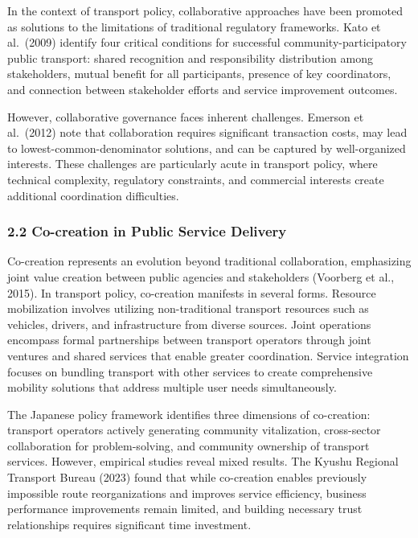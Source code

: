In the context of transport policy, collaborative approaches have been
promoted as solutions to the limitations of traditional regulatory
frameworks. Kato et al.~(2009) identify four critical conditions for
successful community-participatory public transport: shared recognition
and responsibility distribution among stakeholders, mutual benefit for
all participants, presence of key coordinators, and connection between
stakeholder efforts and service improvement outcomes.

However, collaborative governance faces inherent challenges. Emerson et
al.~(2012) note that collaboration requires significant transaction
costs, may lead to lowest-common-denominator solutions, and can be
captured by well-organized interests. These challenges are particularly
acute in transport policy, where technical complexity, regulatory
constraints, and commercial interests create additional coordination
difficulties.

\subsubsection{2.2 Co-creation in Public Service
Delivery}\label{co-creation-in-public-service-delivery}

Co-creation represents an evolution beyond traditional collaboration,
emphasizing joint value creation between public agencies and
stakeholders (Voorberg et al., 2015). In transport policy, co-creation
manifests in several forms. Resource mobilization involves utilizing
non-traditional transport resources such as vehicles, drivers, and
infrastructure from diverse sources. Joint operations encompass formal
partnerships between transport operators through joint ventures and
shared services that enable greater coordination. Service integration
focuses on bundling transport with other services to create
comprehensive mobility solutions that address multiple user needs
simultaneously.

The Japanese policy framework identifies three dimensions of
co-creation: transport operators actively generating community
vitalization, cross-sector collaboration for problem-solving, and
community ownership of transport services. However, empirical studies
reveal mixed results. The Kyushu Regional Transport Bureau (2023) found
that while co-creation enables previously impossible route
reorganizations and improves service efficiency, business performance
improvements remain limited, and building necessary trust relationships
requires significant time investment.

